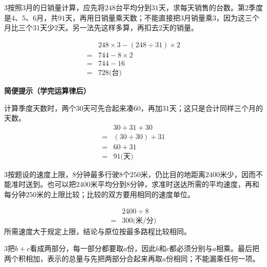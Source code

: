 \documentclass[multi=snippet,border={5bp 20bp 5bp 5bp}]{standalone}
\newenvironment{snippet}[3]{\begin{minipage}{#1bp}\color{answerred}\fontsize{#2}{#3}\selectfont\raggedright}{\end{minipage}}
\begin{document}
\begin{snippet}{505}{11.5}{14}\begin{multicols}{3}\raggedcolumns 按照\(3\)\allowbreak 月的日销量计算，应先将\(248\)\allowbreak 台平均分到\(31\)\allowbreak 天，求每天销售的台数。第\(2\)\allowbreak 季度是\(4\)\allowbreak 、\(5\)\allowbreak 、\(6\)\allowbreak 月，共\(91\)\allowbreak 天，再用日销量乘天数；不能直接把\(3\)\allowbreak 月销量乘\(3\)\allowbreak ，因为这三个月比三个\(31\)\allowbreak 天少\(2\)\allowbreak 天。另一法先这样多算，再扣去\(2\)\allowbreak 天的销量。\par \[\begin{aligned}&248\times3-(248\div31)\times2\\={}&744-8\times2\\={}&744-16\\={}&728\text{(台)}\end{aligned}\]\par\textbf{简便提示（学完运算律后）}\par 计算季度天数时，两个30天可先合起来凑60，再加31天；这只是合计同样三个月的天数。\[\begin{aligned}&30+31+30\\={}&(30+30)+31\\={}&60+31\\={}&91\text{(天)}\end{aligned}\]\end{multicols}\end{snippet}
\begin{snippet}{505}{11.5}{14}\begin{multicols}{3}\raggedcolumns 按题设的速度上限，\(8\)\allowbreak 分钟最多行驶\(8\)\allowbreak 个\(250\)\allowbreak 米，仍比目的地距离\(2400\)\allowbreak 米少，因而不能准时送到。也可以把\(2400\)\allowbreak 米平均分到\(8\)\allowbreak 分钟，求准时送达所需的平均速度，再和每分钟\(250\)\allowbreak 米的上限比较；比较的双方要用相同的速度单位。\par \[\begin{aligned}&2400\div8\\={}&300\text{(米/分)}\end{aligned}\]所需速度大于规定上限，结论与原位按最多路程比较相同。\end{multicols}\end{snippet}
\begin{snippet}{505}{11.5}{14}\begin{multicols}{3}\raggedcolumns 把\(b+c\)\allowbreak 看成两部分，每一部分都要取\(a\)\allowbreak 份，因此\(b\)\allowbreak 和\(c\)\allowbreak 都必须分别与\(a\)\allowbreak 相乘。最后把两个积相加，表示的总量与先把两部分合起来再取\(a\)\allowbreak 份相同；不能漏乘任何一项。\end{multicols}\end{snippet}
\end{document}
